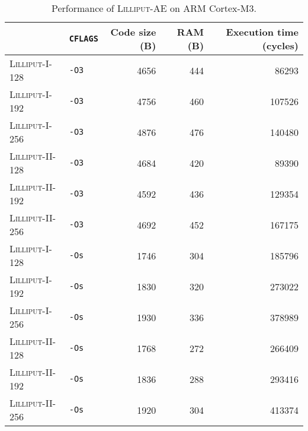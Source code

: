 \begin{table}[H]
  \centering
  \begin{tabular}{l|l||r|r|r}
      \textbf{}                & \textbf{\texttt{CFLAGS}} & \textbf{Code size (B)} & \textbf{RAM (B)} & \textbf{Execution time (cycles)} \\ \hline
      \textsc{Lilliput-I-128}  & \texttt{-O3}             &                   4656 &              444 &                            86293 \\ \hline
      \textsc{Lilliput-I-192}  & \texttt{-O3}             &                   4756 &              460 &                           107526 \\ \hline
      \textsc{Lilliput-I-256}  & \texttt{-O3}             &                   4876 &              476 &                           140480 \\ \hline
      \textsc{Lilliput-II-128} & \texttt{-O3}             &                   4684 &              420 &                            89390 \\ \hline
      \textsc{Lilliput-II-192} & \texttt{-O3}             &                   4592 &              436 &                           129354 \\ \hline
      \textsc{Lilliput-II-256} & \texttt{-O3}             &                   4692 &              452 &                           167175 \\ \hline
      \textsc{Lilliput-I-128}  & \texttt{-Os}             &                   1746 &              304 &                           185796 \\ \hline
      \textsc{Lilliput-I-192}  & \texttt{-Os}             &                   1830 &              320 &                           273022 \\ \hline
      \textsc{Lilliput-I-256}  & \texttt{-Os}             &                   1930 &              336 &                           378989 \\ \hline
      \textsc{Lilliput-II-128} & \texttt{-Os}             &                   1768 &              272 &                           266409 \\ \hline
      \textsc{Lilliput-II-192} & \texttt{-Os}             &                   1836 &              288 &                           293416 \\ \hline
      \textsc{Lilliput-II-256} & \texttt{-Os}             &                   1920 &              304 &                           413374 \\ \hline
  \end{tabular}
  \caption{Performance of \textsc{Lilliput-AE} on ARM Cortex-M3.}
  \label{table:results/lilliput-arm}
\end{table}

